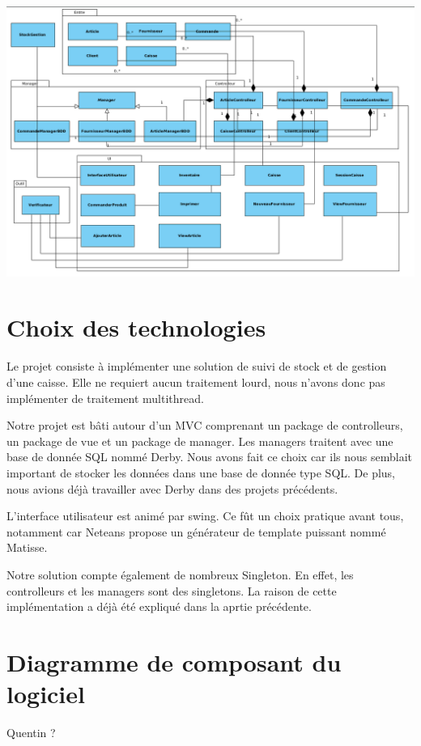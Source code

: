 \begin{center}
\includegraphics[width=14cm]{./Conception/DiagrammeDeClassePackage}
\end{center}

\section{Choix des technologies}
Le projet consiste à implémenter une solution de suivi de stock et de gestion d'une caisse. Elle ne requiert aucun traitement lourd, nous n'avons donc pas implémenter de traitement multithread. 

Notre projet est bâti autour d'un MVC comprenant un package de controlleurs, un package de vue et un package de manager. Les managers traitent avec une base de donnée SQL nommé Derby. Nous avons fait ce choix car ils nous semblait important de stocker les données dans une base de donnée type SQL. De plus, nous avions déjà travailler avec Derby dans des projets précédents.

L'interface utilisateur est animé par swing. Ce fût un choix pratique avant tous, notamment car Neteans propose un générateur de template puissant nommé Matisse.

Notre solution compte également de nombreux Singleton. En effet, les controlleurs et les managers sont des singletons. La raison de cette implémentation a déjà été expliqué dans la aprtie précédente.

\section{Diagramme de composant du logiciel}

Quentin ?

